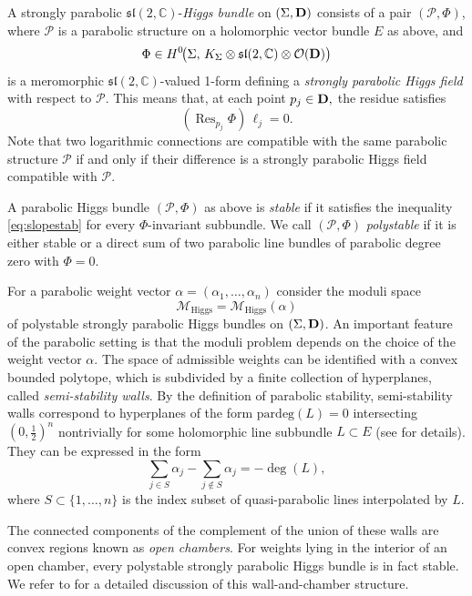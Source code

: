 \documentclass[12pt,a4paper]{amsart}
\theoremstyle{definition}
\theoremstyle{remark}
\newcommand{\C}{\mathbb C}
\newcommand{\Mcal}{\mathcal M}
\newcommand{\Pcal}{\mathcal P}
\begin{document}
A strongly parabolic  $\mathfrak{sl}(2,\C)$-{\em Higgs bundle} on $(\Sigma,{\bf D})$ consists of a pair $(\mathcal P,\Phi)$, where $\mathcal P$ is a parabolic structure on a holomorphic vector bundle $E$ as above, and
\[\Phi \in H^0\!\big(\Sigma,\, K_{\Sigma}\otimes \mathfrak{sl}(2,\C)\otimes \mathcal O({\bf D})\big)
\]
is a meromorphic $\mathfrak{sl}(2,\mathbb C)$-valued 1-form defining a \emph{strongly parabolic Higgs field} with respect to $\mathcal P.$ This means that, at each point $p_j\in{\bf D},$ the residue satisfies
\[(\operatorname{Res}_{p_j}\Phi)\,\ell_j = 0.
\]
Note that two logarithmic connections are compatible with the same parabolic structure $\Pcal$ if and only if their difference is a strongly parabolic Higgs field compatible with $\mathcal P$.

A parabolic Higgs bundle $(\Pcal,\Phi)$ as above  is \emph{stable}  if it satisfies the inequality \eqref{eq:slopestab} for every $\Phi$-invariant  subbundle.
We call $(\Pcal,\Phi)$ \emph{polystable} if it is either stable or a direct sum of two parabolic line bundles of parabolic degree zero with $\Phi=0$.

For a parabolic weight vector \(\alpha=(\alpha_1,\dots,\alpha_n)\) consider the moduli space 
\[\Mcal_{\mathrm{Higgs}}=\Mcal_{\mathrm{Higgs}}(\alpha)\] of polystable strongly parabolic Higgs bundles 
on \((\Sigma,{\bf D})\). An important feature of the parabolic setting is that the moduli problem depends 
on the choice of the weight vector \(\alpha\). 
The space of admissible weights can be identified with a convex bounded polytope, 
which is subdivided by a finite collection of hyperplanes, called 
\emph{semi-stability walls}. By the definition of parabolic stability, semi-stability walls 
correspond to hyperplanes of the form $\mathrm{pardeg}(L)=0$ intersecting $(0,\frac{1}{2})^{n}$
nontrivially for some holomorphic line subbundle $L\subset E$ (see \cite{BY96} for details). They can be expressed in the form
\begin{equation}\label{eq:par-wall}
\sum_{j\in S}\alpha_j-\sum_{j\notin S}\alpha_j = -\deg(L),
\end{equation}
where $S\subset \{1,\dots,n\}$ is the index subset of quasi-parabolic lines interpolated by $L$.

The connected components of the complement of the union of these walls are convex 
regions known as \emph{open chambers}. 
For weights lying in the interior of an open chamber, every polystable strongly 
parabolic Higgs bundle is in fact stable. 
We refer to \cite{BY96, Thaddeus, MenesesSIGMA} for a detailed discussion of this 
wall-and-chamber structure.
\end{document}
